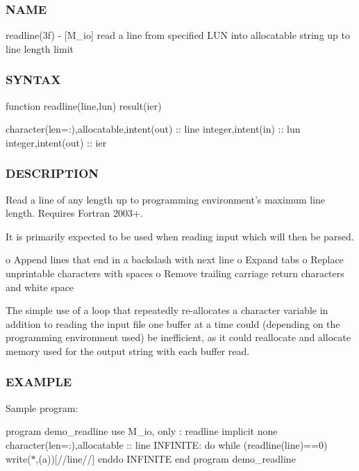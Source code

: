 \subsubsection*{N\+A\+ME}

readline(3f) -\/ \mbox{[}M\+\_\+io\mbox{]} read a line from specified L\+UN into allocatable string up to line length limit 

\subsubsection*{S\+Y\+N\+T\+AX}

function readline(line,lun) result(ier)

character(len=\+:),allocatable,intent(out) \+:\+: line integer,intent(in) \+:\+: lun integer,intent(out) \+:\+: ier

\subsubsection*{D\+E\+S\+C\+R\+I\+P\+T\+I\+ON}

\begin{DoxyVerb}Read a line of any length up to programming environment's maximum
line length. Requires Fortran 2003+.

It is primarily expected to be used when reading input which will
then be parsed.

o Append lines that end in a backslash with next line
o Expand tabs
o Replace unprintable characters with spaces
o Remove trailing carriage return characters and white space

The simple use of a loop that repeatedly re-allocates a character
variable in addition to reading the input file one buffer at a
time could (depending on the programming environment used) be
inefficient, as it could reallocate and allocate memory used for
the output string with each buffer read.
\end{DoxyVerb}


\subsubsection*{E\+X\+A\+M\+P\+LE}

Sample program\+:

program demo\+\_\+readline use M\+\_\+io, only \+: readline implicit none character(len=\+:),allocatable \+:\+: line I\+N\+F\+I\+N\+I\+TE\+: do while (readline(line)==0) write($\ast$,\textquotesingle{}(a)\textquotesingle{})\textquotesingle{}\mbox{[}\textquotesingle{}//line//\textquotesingle{}\mbox{]}\textquotesingle{} enddo I\+N\+F\+I\+N\+I\+TE end program demo\+\_\+readline 

